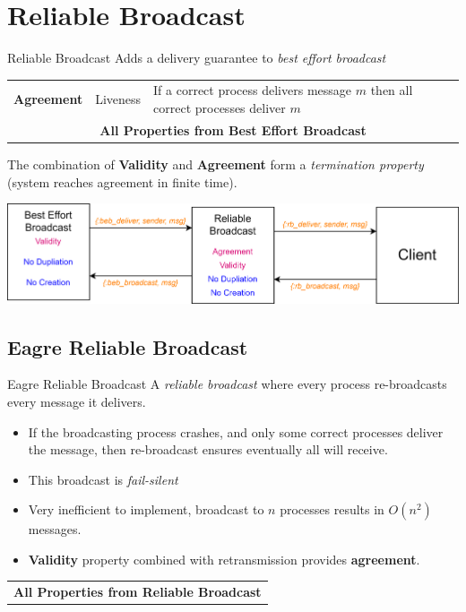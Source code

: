 \inputminted{elixir}{reliable_broadcast/code/perfect_point_to_point_links.ex}

\section{Reliable Broadcast}
\begin{definitionbox}{Reliable Broadcast}
    Adds a delivery guarantee to \textit{best effort broadcast}  
    \begin{center}
        \begin{tabular}{l l p{}}
            \textbf{Agreement} & Liveness & If a correct process delivers message $m$ then all correct processes deliver $m$ \\
            \multicolumn{3}{c}{\textbf{All Properties from Best Effort Broadcast}} \\
        \end{tabular}
    \end{center}
    The combination of \textbf{Validity} and \textbf{Agreement} form a \textit{termination property} (system reaches agreement in finite time).
\end{definitionbox}
\begin{center}
  \includegraphics[width=.8\textwidth]{reliable_broadcast/images/reliable_broadcast.drawio.png}
\end{center}

\subsection{Eagre Reliable Broadcast}
\begin{definitionbox}{Eagre Reliable Broadcast}
    A \textit{reliable broadcast} where every process re-broadcasts every message it delivers.
    \begin{itemize}
        \item If the broadcasting process crashes, and only some correct processes deliver the message, then re-broadcast ensures eventually all will receive.
        \item This broadcast is \textit{fail-silent}
        \item Very inefficient to implement, broadcast to $n$ processes results in $O(n^2)$ messages.
        \item \textbf{Validity} property combined with retransmission provides \textbf{agreement}.
    \end{itemize}
    \begin{center}
        \begin{tabular}{l l p{}}
            \multicolumn{3}{c}{\textbf{All Properties from Reliable Broadcast}} \\
        \end{tabular}
    \end{center}
\end{definitionbox}

